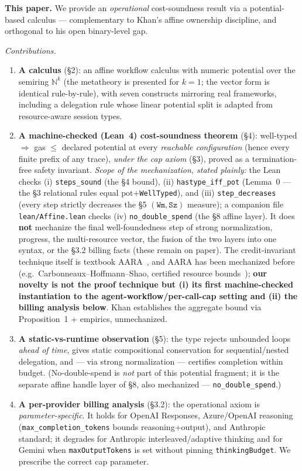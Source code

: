 \documentclass[11pt]{article}
\theoremstyle{plain}
\newcommand{\pot}{\mathrm{pot}}
\begin{document}
\textbf{This paper.} We provide an \emph{operational} cost-soundness result via a potential-based
calculus --- complementary to Khan's affine ownership discipline, and orthogonal to his open
binary-level gap.

\emph{Contributions.}
\begin{enumerate}
\item \textbf{A calculus} (\S2): an affine workflow calculus with numeric potential over the
  semiring $\mathbb{N}^k$ (the metatheory is presented for $k=1$; the vector form is identical
  rule-by-rule), with seven constructs mirroring real frameworks, including a delegation rule whose
  linear potential split is adapted from resource-aware session types.
\item \textbf{A machine-checked (Lean~4) cost-soundness theorem} (\S4): well-typed $\Longrightarrow$
  gas $\le$ declared potential at every \emph{reachable configuration} (hence every finite prefix
  of any trace), \emph{under the cap axiom} (\S3), proved as a termination-free safety invariant.
  \emph{Scope of the mechanization, stated plainly:} the Lean checks (i) \texttt{steps\_sound} (the
  \S4 bound), (ii) \texttt{hastype\_iff\_pot} (Lemma~0 --- the \S3 relational rules equal
  $\pot$+\texttt{WellTyped}), and (iii) \texttt{step\_decreases} (every step strictly decreases the
  \S5 $(\texttt{Wm},\texttt{Sz})$ measure); a companion file \texttt{lean/Affine.lean} checks (iv)
  \texttt{no\_double\_spend} (the \S8 affine layer). It does \textbf{not} mechanize the final
  well-foundedness step of strong normalization, progress, the multi-resource vector, the fusion of
  the two layers into one syntax, or the \S3.2 billing facts (these remain on paper). The
  credit-invariant technique itself is textbook AARA~\cite{hofmannjost2003}, and AARA has been
  mechanized before (e.g.\ Carbonneaux--Hoffmann--Shao, certified resource
  bounds~\cite{carbonneaux2015}); \textbf{our novelty is not the proof technique but (i) its first
  machine-checked instantiation to the agent-workflow/per-call-cap setting and (ii) the billing
  analysis below}. Khan establishes the aggregate bound via Proposition~1 + empirics, unmechanized.
\item \textbf{A static-vs-runtime observation} (\S5): the type rejects unbounded loops \emph{ahead
  of time}, gives static compositional conservation for sequential/nested delegation, and --- via
  strong normalization --- certifies completion within budget. (No-double-spend is \emph{not} part
  of this potential fragment; it is the separate affine handle layer of \S8, also mechanized ---
  \texttt{no\_double\_spend}.)
\item \textbf{A per-provider billing analysis} (\S3.2): the operational axiom is
  \emph{parameter-specific}. It holds for OpenAI Responses, Azure/OpenAI reasoning
  (\texttt{max\_completion\_tokens} bounds reasoning+output), and Anthropic standard; it degrades
  for Anthropic interleaved/adaptive thinking and for Gemini when \texttt{maxOutputTokens} is set
  without pinning \texttt{thinkingBudget}. We prescribe the correct cap parameter.
\end{enumerate}
\end{document}
